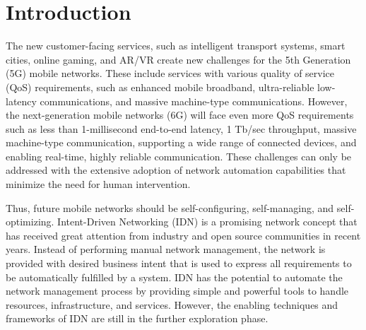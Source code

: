 

\usepackage{xcolor} 
\usepackage{listings}





\tableofcontents

\clearpage
{}

\section{Introduction}
\label{sec:Introduction}

The new customer-facing services, such as intelligent transport systems, smart cities, online gaming, and AR/VR create new challenges for the 5th Generation (5G) mobile networks. These include services with various quality of service (QoS) requirements, such as enhanced mobile broadband, ultra-reliable low-latency communications, and massive machine-type communications. However, the next-generation mobile networks (6G) will face even more QoS requirements such as less than 1-millisecond end-to-end latency, 1 Tb/sec throughput,  massive machine-type communication, supporting a wide range of connected devices, and enabling real-time, highly reliable communication. These challenges can only be addressed with the extensive adoption of network automation capabilities that minimize the need for human intervention. 

Thus, future mobile networks should be self-configuring, self-managing, and self-optimizing. Intent-Driven Networking (IDN) is a promising network concept that has received great attention from industry and open source communities in recent years. Instead of performing manual network management, the network is provided with desired business intent that is used to express all requirements to be automatically fulfilled by a system. IDN has the potential to automate the network management process by providing simple and powerful tools to handle resources, infrastructure, and services\cite{Mwanje2021}. However, the enabling techniques and frameworks of IDN are still in the further exploration phase.

